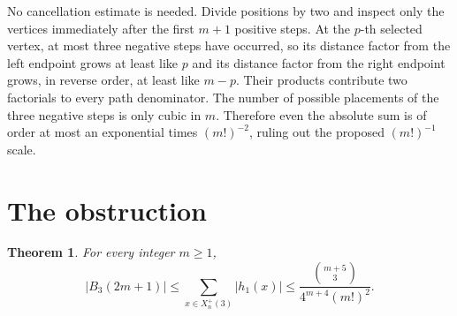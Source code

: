 \documentclass[11pt]{article}
\newtheorem{theorem}{Theorem}
\begin{document}
No cancellation estimate is needed.  Divide positions by two and inspect
only the vertices immediately after the first $m+1$ positive steps.  At the
$p$-th selected vertex, at most three negative steps have occurred, so its
distance factor from the left endpoint grows at least like $p$ and its
distance factor from the right endpoint grows, in reverse order, at least
like $m-p$.  Their products contribute two factorials to every path
denominator.  The number of possible placements of the three negative steps
is only cubic in $m$.  Therefore even the absolute sum is of order at most an
exponential times $(m!)^{-2}$, ruling out the proposed $(m!)^{-1}$ scale.

\section{The obstruction}

\begin{theorem}\label{thm:bound}
For every integer $m\geq1$,
\begin{equation}\label{eq:main-bound}
 |B_3(2m+1)|
 \leq \sum_{x\in X_n^+(3)}|h_1(x)|
 \leq \frac{\binom{m+5}{3}}{4^{m+4}(m!)^2}.
\end{equation}
\end{theorem}
\end{document}
